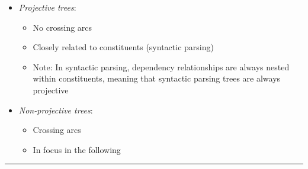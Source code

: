 \begin{itemize}
    \begin{itemize}
        \item \emph{Projective trees}:
        \begin{itemize}
            \item No crossing arcs
            \item Closely related to constituents (syntactic parsing)
            \item Note: In syntactic parsing, dependency relationships are always nested within constituents, meaning that syntactic parsing trees are always projective
        \end{itemize}
        \item \emph{Non-projective trees}:
        \begin{itemize}
            \item Crossing arcs
            \item In focus in the following
        \end{itemize}
    \end{itemize}
\end{itemize}

{\color{lightgray}\hrule height 0.001mm}


